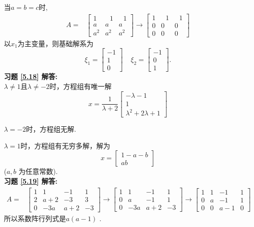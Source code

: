 \documentclass[a4paper]{book}
\begin{document}
当$a=b=c$时,
\begin{displaymath}
\begin{aligned}
A=&\begin{bmatrix}1&\ \ \ 1&\ \ \ 1\\a&a&a\\a^2&a^2&a^2 \end{bmatrix}\rightarrow
\begin{bmatrix} 1&\ \ \ 1&\ \ \ 1\\0&0&0\\0&0&0 \end{bmatrix}
\end{aligned} \end{displaymath}
以$x_1$为主变量，则基础解系为$$\xi_1=\begin{bmatrix}-1\\1\\0\end{bmatrix}\ \ \ \ \ \xi_2=\begin{bmatrix}-1\\0\\1\end{bmatrix}.$$
\textbf{习题 \ref{5.18} 解答:}\\
 $\lambda\not=1$且$\lambda\not=-2$时，方程组有唯一解$$x=\frac{1}{\lambda+2} \begin{bmatrix} -\lambda-1\\1\\ \lambda ^2+2\lambda+1\end{bmatrix}$$

$\lambda=-2$时，方程组无解.


$\lambda=1$时，方程组有无穷多解，解为$$x=\begin{bmatrix}1-a-b\\ab\end{bmatrix}$$   ($a,b$ 为任意常数).\\
\textbf{习题 \ref{5.19} 解答:}\\
\begin{displaymath}
\begin{aligned}
A=&\begin{bmatrix} 1&1&-1&1\\2&a+2&-3&3\\0&-3a&a+2&-3  \end{bmatrix}\rightarrow
\begin{bmatrix}1&1&-1&1\\0&a&-1&1\\0&-3a&a+2&-3   \end{bmatrix}\rightarrow
\begin{bmatrix} 1&1&-1&1\\0&a&-1&1\\0&0&a-1&0  \end{bmatrix}\end{aligned} \end{displaymath}
所以系数阵行列式是$a(a-1)$ .
\end{document}
